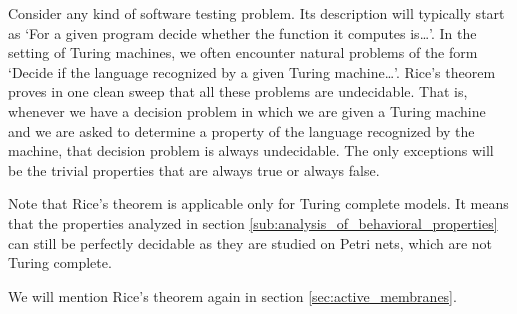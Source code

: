 Consider any kind of software testing problem. Its description will typically start as `For a given program decide whether the function it computes is\ldots'. In the setting of Turing machines, we often encounter natural problems of the form `Decide if the language recognized by a given Turing machine\ldots'. Rice's theorem \cite{Rice53Theorem} proves in one clean sweep that all these problems are undecidable. That is, whenever we have a decision problem in which we are given a Turing machine and we are asked to determine a property of the language recognized by the machine, that decision problem is always undecidable. The only exceptions will be the trivial properties that are always true or always false.

Note that Rice's theorem is applicable only for Turing complete models. It means that the properties analyzed in section \ref{sub:analysis_of_behavioral_properties} can still be perfectly decidable as they are studied on Petri nets, which are not Turing complete.

We will mention Rice's theorem again in section \ref{sec:active_membranes}.